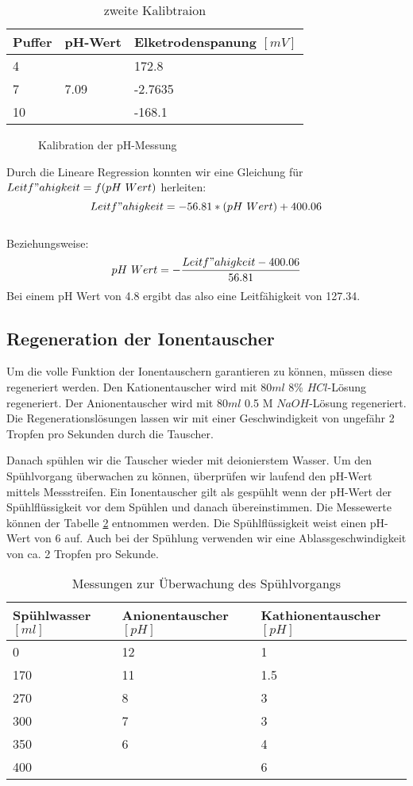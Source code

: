 \documentclass[10pt,oneside,a4paper,fleqn]{article}
\begin{document}
\begin{table}[!h]
\caption{zweite Kalibtraion}
\label{tab:zweiteKal}
\centering
	\begin{tabular}{|l|l|l|}
		\hline
		Puffer & pH-Wert & Elketrodenspanung $\left[mV\right]$\\
		\hline
		4 &  & 172.8\\
		\hline
		7 & 7.09& -2.7635\\
		\hline
		10 &  & -168.1\\
		\hline
	\end{tabular}
\end{table}

\newpage

\begin{figure}[!h]
	\centering
	
	\caption{Kalibration der pH-Messung}
	\label{fig:pHKalibration}
\end{figure}

Durch die Lineare Regression konnten wir eine Gleichung für
$Leitf"ahigkeit=f(pH\ Wert)$ herleiten:
$$Leitf"ahigkeit = -56.81*(pH\ Wert)+400.06$$\\
Beziehungsweise:
$$pH\ Wert =  -\frac{Leitf"ahigkeit-400.06}{56.81}$$
Bei einem pH Wert von 4.8 ergibt das also eine Leitfähigkeit von 127.34.

\subsection{Regeneration der Ionentauscher}
Um die volle Funktion der Ionentauschern garantieren zu können, müssen diese
regeneriert werden. Den Kationentauscher wird mit $80 ml$ 8\%
$HCl$-Lösung regeneriert. Der Anionentauscher wird mit $80 ml$  0.5 M
$NaOH$-Lösung regeneriert. Die Regenerationslösungen lassen wir mit einer
Geschwindigkeit von ungefähr 2 Tropfen pro Sekunden durch die Tauscher.

Danach spühlen wir die Tauscher wieder mit deionierstem Wasser.
Um den Spühlvorgang überwachen zu können, überprüfen wir laufend den pH-Wert
mittels Messstreifen. Ein Ionentauscher gilt als gespühlt wenn der pH-Wert der
Spühlflüssigkeit vor dem Spühlen und danach übereinstimmen. Die Messewerte können
 der Tabelle \ref{spuehl} entnommen werden. Die Spühlflüssigkeit weist
einen pH-Wert von 6 auf. Auch bei der Spühlung verwenden wir eine
Ablassgeschwindigkeit von ca. 2 Tropfen pro Sekunde.

\begin{table}[h]
\caption{Messungen zur Überwachung des Spühlvorgangs}
\label{spuehl}
\centering
	\begin{tabular}{|l|l|l|}
	\hline
	Spühlwasser $\left[ml\right]$ & Anionentauscher $\left[pH\right]$ &
	Kathionentauscher $\left[pH\right]$\\
	\hline
	0 & 12 & 1 \\
	\hline
	170 & 11 & 1.5 \\
	\hline
	270 & 8 & 3 \\
	\hline
	300 & 7 & 3\\
	\hline
	350 & 6 & 4\\
	\hline
	400 & & 6 \\ 
	\hline
	\end{tabular}
\end{table}
\end{document}
